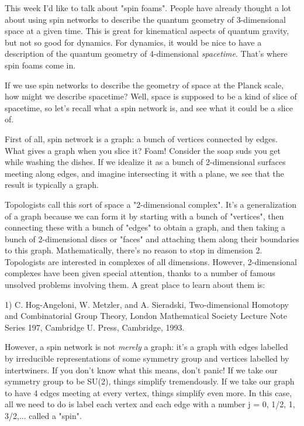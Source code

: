 


This week I'd like to talk about "spin foams".  People have already
thought a lot about using spin networks to describe the quantum geometry
of 3-dimensional space at a given time.  This is great for kinematical
aspects of quantum gravity, but not so good for dynamics.  For dynamics,
it would be nice to have a description of the quantum geometry of
4-dimensional \emph{spacetime}.  That's where spin foams come in.

If we use spin networks to describe the geometry of space at the Planck
scale, how might we describe spacetime?  Well, space is supposed to be a
kind of slice of spacetime, so let's recall what a spin network is, and
see what it could be a slice of.

First of all, spin network is a graph: a bunch of vertices connected by
edges.  What gives a graph when you slice it?  Foam!  Consider the soap
suds you get while washing the dishes.  If we idealize it as a bunch 
of 2-dimensional surfaces meeting along edges, and imagine intersecting 
it with a plane, we see that the result is typically a graph.  

Topologists call this sort of space a "2-dimensional complex".  It's a
generalization of a graph because we can form it by starting with a
bunch of "vertices", then connecting these with a bunch of "edges" to
obtain a graph, and then taking a bunch of 2-dimensional discs or
"faces" and attaching them along their boundaries to this graph.
Mathematically, there's no reason to stop in dimension 2.  Topologists
are interested in complexes of all dimensions.  However, 2-dimensional
complexes have been given special attention, thanks to a number of
famous unsolved problems involving them.  A great place to learn about
them is:

1) C. Hog-Angeloni, W. Metzler, and A. Sieradski, Two-dimensional
Homotopy and Combinatorial Group Theory, London Mathematical Society
Lecture Note Series 197, Cambridge U. Press, Cambridge, 1993.

However, a spin network is not \emph{merely} a graph: it's a graph with edges
labelled by irreducible representations of some symmetry group and
vertices labelled by intertwiners.  If you don't know what this means,
don't panic!  If we take our symmetry group to be SU(2), things simplify
tremendously.  If we take our graph to have 4 edges meeting at every
vertex, things simplify even more.  In this case, all we need to do is
label each vertex and each edge with a number j = 0, 1/2, 1, 3/2,...   
called a "spin".

